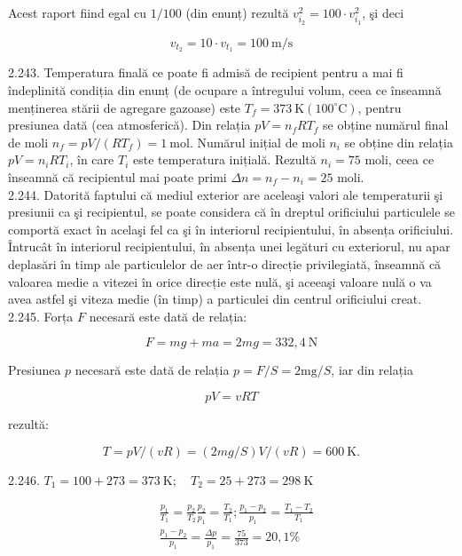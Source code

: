\documentclass[10pt]{article}
\begin{document}
Acest raport fiind egal cu $1 / 100$ (din enunț) rezultă $v_{i_{2}}^{2}=100 \cdot v_{i_{1}}^{2}$, şi deci

$$
v_{t_{2}}=10 \cdot v_{t_{1}}=100 \mathrm{~m} / \mathrm{s}
$$

2.243. Temperatura finală ce poate fi admisă de recipient pentru a mai fi îndeplinită condiția din enunț (de ocupare a întregului volum, ceea ce înseamnă menținerea stării de agregare gazoase) este $T_{f}=373 \mathrm{~K}\left(100^{\circ} \mathrm{C}\right)$, pentru presiunea dată (cea atmosferică). Din relația $p V=n_{f} R T_{f}$ se obține numărul final de moli $n_{f}=p V /\left(R T_{f}\right)=1 \mathrm{~mol}$. Numărul inițial de moli $n_{i}$ se obține din relația $p V=n_{i} R T_{i}$, în care $T_{i}$ este temperatura inițială. Rezultă $n_{i}=75$ moli, ceea ce înseamnă că recipientul mai poate primi $\Delta n=n_{f}-n_{i}=25$ moli.\\
2.244. Datorită faptului că mediul exterior are aceleaşi valori ale temperaturii şi presiunii ca şi recipientul, se poate considera că în dreptul orificiului particulele se comportă exact în acelaşi fel ca şi în interiorul recipientului, în absența orificiului. Întrucât în interiorul recipientului, în absența unei legături cu exteriorul, nu apar deplasări în timp ale particulelor de aer într-o direcție privilegiată, înseamnă că valoarea medie a vitezei în orice direcție este nulă, şi aceeaşi valoare nulă o va avea astfel şi viteza medie (în timp) a particulei din centrul orificiului creat.\\
2.245. Forța $F$ necesară este dată de relația:

$$
F=m g+m a=2 m g=332,4 \mathrm{~N}
$$

Presiunea $p$ necesară este dată de relația $p=F / S=2 \mathrm{mg} / S$, iar din relația

$$
p V=v R T
$$

rezultă:

$$
T=p V /(v R)=(2 m g / S) V /(v R)=600 \mathrm{~K} .
$$

2.246. $T_{1}=100+273=373 \mathrm{~K} ; \quad T_{2}=25+273=298 \mathrm{~K}$

$$
\begin{aligned}
& \frac{p_{1}}{T_{1}}=\frac{p_{2}}{T_{2}} \frac{p_{2}}{p_{1}}=\frac{T_{2}}{T_{1}} ; \frac{p_{1}-p_{2}}{p_{1}}=\frac{T_{1}-T_{2}}{T_{1}} \\
& \frac{p_{1}-p_{2}}{p_{1}}=\frac{\Delta p}{p_{1}}=\frac{75}{373}=20,1 \%
\end{aligned}
$$
\end{document}
